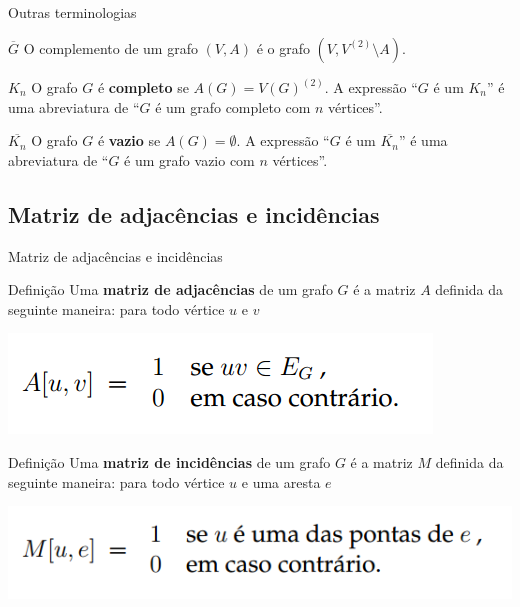 \documentclass[xcolor=dvipsnames,table]{beamer}
\begin{document}
	\begin{frame}{Outras terminologias}
		\begin{block}{$\overline{G}$}
			O complemento de um grafo $(V, A)$ é o grafo $(V, V^{(2)} \setminus A)$.
		\end{block}
		\pause
		\begin{block}{$K_n$} 
			O grafo $G$ é {\bf completo} se $A(G) = V(G)^{(2)}$. A expressão ``$G$ é um $K_n$'' é uma abreviatura de ``$G$ é um grafo completo com $n$ vértices''.
		\end{block}
		\pause
		\begin{block}{$\overline{K_n}$} 
			O grafo $G$ é {\bf vazio} se $A(G) =\emptyset$. A expressão ``$G$ é um $\overline{K_n}$'' é uma abreviatura de ``$G$ é um grafo vazio com $n$ vértices''.
		\end{block}
	\end{frame}
    
    \subsection{Matriz de adjacências e incidências}
	\begin{frame}{Matriz de adjacências e incidências}
		\begin{block}{Definição}
			Uma {\bf matriz de adjacências} de um grafo $G$ é a matriz $A$ definida da seguinte maneira: para todo vértice $u$ e $v$
			\begin{center}
				\includegraphics[width=.5\textwidth]{images/adjacencia.png}
			\end{center}
		\end{block} \pause
		\begin{block}{Definição}
			Uma {\bf matriz de incidências} de um grafo $G$ é a matriz $M$ definida da seguinte maneira: para todo vértice $u$ e uma aresta $e$
			\begin{center}
				\includegraphics[width=.6\textwidth]{images/incidencia.png}
			\end{center}
		\end{block}
	\end{frame}
    
\end{document}
